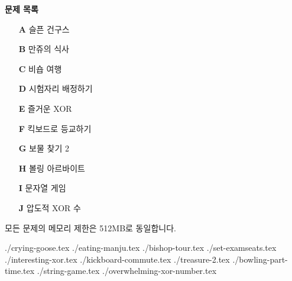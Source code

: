 \documentclass[10pt,a4paper,oneside,dvipsnames]{article}
\newcommand{\importproblem}[1]{{./#1.tex}}
\begin{document}
\BuildContestTitle


\begin{center}
    \textbf{\Large\textsf{문제 목록}}
\end{center}


\begin{center}
    \begin{minipage}{0.35\textwidth}
        \begin{itemize}
            
	\item[\textbf{A}] 슬픈 건구스
	\item[\textbf{B}] 만쥬의 식사
	\item[\textbf{C}] 비숍 여행
	\item[\textbf{D}] 시험자리 배정하기
	\item[\textbf{E}] 즐거운 XOR
	\item[\textbf{F}] 킥보드로 등교하기
	\item[\textbf{G}] 보물 찾기 2
	\item[\textbf{H}] 볼링 아르바이트
	\item[\textbf{I}] 문자열 게임
	\item[\textbf{J}] 압도적 XOR 수


        \end{itemize}    
    \end{minipage}
\end{center}

모든 문제의 메모리 제한은 512MB로 동일합니다.
\newpage

\importproblem{crying-goose}
\importproblem{eating-manju} 
\importproblem{bishop-tour} 
\importproblem{set-examseats} 
\importproblem{interesting-xor} 
\importproblem{kickboard-commute} 
\importproblem{treasure-2} 
\importproblem{bowling-part-time}
\importproblem{string-game}
\importproblem{overwhelming-xor-number} 
\end{document}

